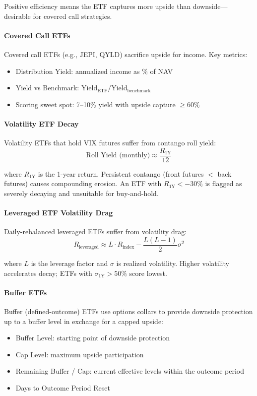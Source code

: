 Positive efficiency means the ETF captures more upside than downside---desirable for covered call strategies.

\paragraph{Covered Call ETFs}

Covered call ETFs (e.g., JEPI, QYLD) sacrifice upside for income. Key metrics:
\begin{itemize}
  \item Distribution Yield: annualized income as \% of NAV
  \item Yield vs Benchmark: $\text{Yield}_{\text{ETF}} / \text{Yield}_{\text{benchmark}}$
  \item Scoring sweet spot: 7--10\% yield with upside capture $\geq 60\%$
\end{itemize}

\paragraph{Volatility ETF Decay}

Volatility ETFs that hold VIX futures suffer from contango roll yield:
\[
\text{Roll Yield (monthly)} \approx \frac{R_{\text{1Y}}}{12}
\]

where $R_{\text{1Y}}$ is the 1-year return. Persistent contango (front futures $<$ back futures) causes compounding erosion. An ETF with $R_{\text{1Y}} < -30\%$ is flagged as severely decaying and unsuitable for buy-and-hold.

\paragraph{Leveraged ETF Volatility Drag}

Daily-rebalanced leveraged ETFs suffer from volatility drag:
\[
R_{\text{leveraged}} \approx L \cdot R_{\text{index}} - \frac{L(L-1)}{2} \sigma^2
\]

where $L$ is the leverage factor and $\sigma$ is realized volatility. Higher volatility accelerates decay; ETFs with $\sigma_{\text{1Y}} > 50\%$ score lowest.

\paragraph{Buffer ETFs}

Buffer (defined-outcome) ETFs use options collars to provide downside protection up to a buffer level in exchange for a capped upside:
\begin{itemize}
  \item Buffer Level: starting point of downside protection
  \item Cap Level: maximum upside participation
  \item Remaining Buffer / Cap: current effective levels within the outcome period
  \item Days to Outcome Period Reset
\end{itemize}

